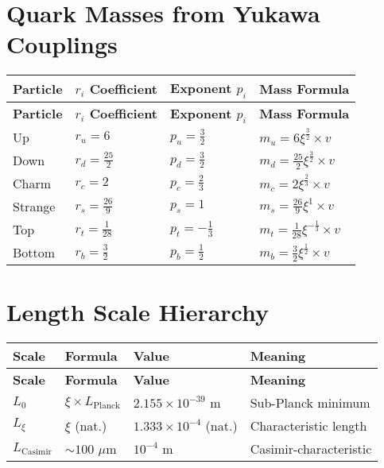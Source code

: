 \documentclass[12pt,a4paper]{article}
\begin{document}
	\section{Quark Masses from Yukawa Couplings}
	
	\begin{longtable}{|p{2.5cm}|p{3cm}|p{3cm}|p{5cm}|}
		\hline
		\textbf{Particle} & \textbf{\(r_i\) Coefficient} & \textbf{Exponent \(p_i\)} & \textbf{Mass Formula} \\
		\hline
		\endfirsthead
		\hline
		\textbf{Particle} & \textbf{\(r_i\) Coefficient} & \textbf{Exponent \(p_i\)} & \textbf{Mass Formula} \\
		\hline
		\endhead
		Up & \(r_u = 6\) & \(p_u = \frac{3}{2}\) & \(m_u = 6\xi^{\frac{3}{2}} \times v\) \\
		\hline
		Down & \(r_d = \frac{25}{2}\) & \(p_d = \frac{3}{2}\) & \(m_d = \frac{25}{2}\xi^{\frac{3}{2}} \times v\) \\
		\hline
		Charm & \(r_c = 2\) & \(p_c = \frac{2}{3}\) & \(m_c = 2\xi^{\frac{2}{3}} \times v\) \\
		\hline
		Strange & \(r_s = \frac{26}{9}\) & \(p_s = 1\) & \(m_s = \frac{26}{9}\xi^{1} \times v\) \\
		\hline
		Top & \(r_t = \frac{1}{28}\) & \(p_t = -\frac{1}{3}\) & \(m_t = \frac{1}{28}\xi^{-\frac{1}{3}} \times v\) \\
		\hline
		Bottom & \(r_b = \frac{3}{2}\) & \(p_b = \frac{1}{2}\) & \(m_b = \frac{3}{2}\xi^{\frac{1}{2}} \times v\) \\
		\hline
	\end{longtable}
	
	\section{Length Scale Hierarchy}
	
	\begin{longtable}{|p{3cm}|p{4cm}|p{4cm}|p{4cm}|}
		\hline
		\textbf{Scale} & \textbf{Formula} & \textbf{Value} & \textbf{Meaning} \\
		\hline
		\endfirsthead
		\hline
		\textbf{Scale} & \textbf{Formula} & \textbf{Value} & \textbf{Meaning} \\
		\hline
		\endhead
		\(L_0\) & \(\xi \times L_{\text{Planck}}\) & \(2.155 \times 10^{-39}\) m & Sub-Planck minimum \\
		\hline
		\(L_{\xi}\) & \(\xi\) (nat.) & \(1.333 \times 10^{-4}\) (nat.) & Characteristic length \\
		\hline
		\(L_{\text{Casimir}}\) & \(\sim 100\) \(\mu\)m & \(10^{-4}\) m & Casimir-characteristic \\
		\hline
	\end{longtable}
	
\end{document}
